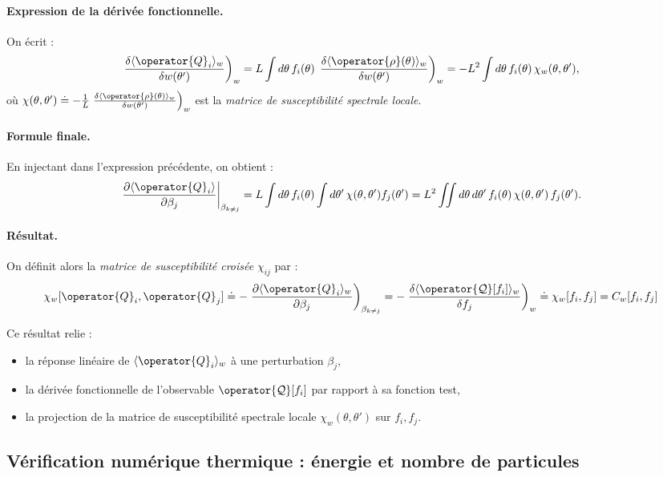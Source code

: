 \paragraph{Expression de la dérivée fonctionnelle.}
On écrit :
\[
\left. \frac{\delta \langle \operator{Q}_i \rangle_w }{ \delta w(\theta') } \right)_{w} = L \int d\theta\, f_i(\theta)\, \left. \frac{\delta \langle \operator{\rho}(\theta) \rangle_w }{ \delta w(\theta') } \right)_{w} = - L^2 \int d\theta\, f_i(\theta)\, \chi_w(\theta, \theta'),
\]
où \( \chi(\theta, \theta') \doteq  - \frac{1}{L} \left. \frac{\delta \langle \operator{\rho}(\theta) \rangle_w }{ \delta w(\theta') } \right)_{w} \) est la {\em matrice de susceptibilité spectrale locale}.

\paragraph{Formule finale.}
En injectant dans l'expression précédente, on obtient :
\[
\left. \frac{\partial \langle \operator{Q}_i \rangle }{ \partial \beta_j } \right|_{\beta_{k \ne j}} = L \int d\theta\, f_i(\theta) \int d\theta'\, \chi(\theta, \theta') f_j(\theta') = L^2 \iint d\theta\, d\theta'\, f_i(\theta)\, \chi(\theta, \theta')\, f_j(\theta').
\]

\paragraph{Résultat.}
On définit alors la {\em matrice de susceptibilité croisée} \( \chi_{ij} \) par :
\[
\chi_w[\operator{Q}_i , \operator{Q}_j] \doteq - \left. \frac{\partial \langle \operator{Q}_i \rangle_w }{ \partial \beta_j } \right)_{\beta_{k \ne j}} = - \left. \frac{\delta \langle \operator{\mathcal{Q}}[f_i] \rangle_w }{ \delta f_j } \right)_{w} \doteq  \chi_w[f_i , f_j ] = C_w[f_i , f_j] 
\]

Ce résultat relie :
\begin{itemize}[label =$\bullet$] 
  \item la réponse linéaire de \( \langle \operator{Q}_i \rangle_w \) à une perturbation \( \beta_j \),
  \item la dérivée fonctionnelle de l’observable \( \operator{\mathcal{Q}}[f_i] \) par rapport à sa fonction test,
  \item la projection de la matrice de susceptibilité spectrale locale \( \chi_w(\theta, \theta') \) sur \( f_i, f_j \).
\end{itemize}

\subsection{Vériﬁcation numérique thermique :  énergie et nombre de particules}


